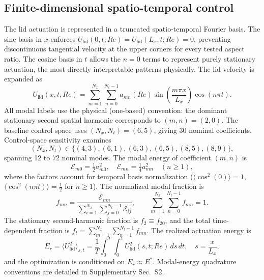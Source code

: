 \documentclass[a4paper,11pt]{article}
\begin{document}
\subsection{Finite-dimensional spatio-temporal control}

The lid actuation is represented in a truncated spatio-temporal Fourier basis.
The sine basis in \(x\) enforces \(U_{\mathrm{lid}}(0,t;Re)=U_{\mathrm{lid}}(L_x,t;Re)=0\),
preventing discontinuous tangential velocity at the upper corners for every
tested aspect ratio. The cosine basis in \(t\) allows the \(n=0\) terms to
represent purely stationary actuation, the most directly interpretable patterns
physically. The lid velocity is expanded as
\begin{equation}
U_{\mathrm{lid}}(x,t,Re)=\sum_{m=1}^{N_x}\sum_{n=0}^{N_t-1}
a_{mn}(Re)\sin\!\left(\frac{m\pi x}{L_x}\right)\cos(n\pi t).
\label{eq:fourier_control}
\end{equation}
All modal labels use the physical (one-based) convention: the dominant stationary
second spatial harmonic corresponds to \((m,n)=(2,0)\). The baseline control space
uses \((N_x,N_t)=(6,5)\), giving 30 nominal coefficients. Control-space sensitivity
examines
\begin{equation}
(N_x,N_t)\in\{(4,3),(6,1),(6,3),(6,5),(8,5),(8,9)\},
\label{eq:truncation_sweep}
\end{equation}
spanning 12 to 72 nominal modes. The modal energy of coefficient \((m,n)\) is
\begin{equation}
\mathcal{E}_{m0}=\tfrac{1}{2}a_{m0}^2,\quad
\mathcal{E}_{mn}=\tfrac{1}{4}a_{mn}^2\quad(n\ge1),
\label{eq:modal_energy}
\end{equation}
where the factors account for temporal basis normalization
(\(\langle\cos^2(0)\rangle=1\), \(\langle\cos^2(n\pi t)\rangle=\tfrac{1}{2}\) for \(n\ge1\)).
The normalized modal fraction is
\begin{equation}
f_{mn}=\frac{\mathcal{E}_{mn}}{\displaystyle\sum_{i=1}^{N_x}\sum_{j=0}^{N_t-1}\mathcal{E}_{ij}},
\qquad\sum_{m=1}^{N_x}\sum_{n=0}^{N_t-1}f_{mn}=1.
\label{eq:modal_fraction}
\end{equation}
The stationary second-harmonic fraction is \(f_2\equiv f_{20}\), and the total
time-dependent fraction is \(f_t=\sum_{m=1}^{N_x}\sum_{n=1}^{N_t-1}f_{mn}\).
The realized actuation energy is
\begin{equation}
E_r=\langle U_{\mathrm{lid}}^2\rangle_{s,t}
=\frac{1}{T}\int_0^T\!\!\int_0^1 U_{\mathrm{lid}}^2(s,t;Re)\,ds\,dt,
\quad s=\frac{x}{L_x},
\label{eq:realized_energy}
\end{equation}
and the optimization is conditioned on \(E_r\approx E^*\). Modal-energy quadrature
conventions are detailed in Supplementary Sec.~S2.
\end{document}
